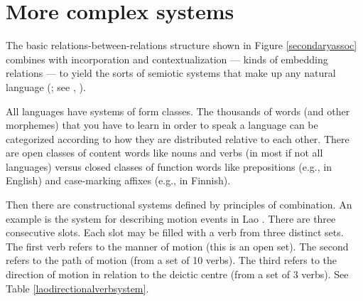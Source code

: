 
\section{More complex systems}


The basic relations-between-relations structure shown in Figure \ref{secondaryassoc} combines with incorporation and contextualization --- kinds of embedding relations --- to yield the sorts of semiotic systems that make up any natural language 
(\citealt{saussure_cours_1916}; see \citealt{dixon_basic_2010,dixon_basics_2014}, \citealt{bickel_linguistic_2014}). 



All languages have systems of form classes. The thousands of 
words (and other morphemes) that you have to learn in order to 
speak a language can be categorized according to how they are
distributed relative to each other. There are open classes of 
content words like nouns and verbs (in most if not all languages) versus closed classes of function 
words like prepositions (e.g., in English) and case-marking affixes 
(e.g., in Finnish). 



Then there are constructional systems defined by principles of combination. An example is the system for describing motion 
events in Lao \citep[387--389]{enfield_grammar_2007}. There are three consecutive 
slots. Each slot may be filled with a 
verb from three distinct sets. The first verb refers to the manner of 
motion (this is an open set). The second refers to the path of motion 
(from a set of 10 verbs). The third refers to the 
direction of motion in relation to the deictic centre (from a set 
of 3 verbs). See Table \ref{laodirectionalverbsystem}.


